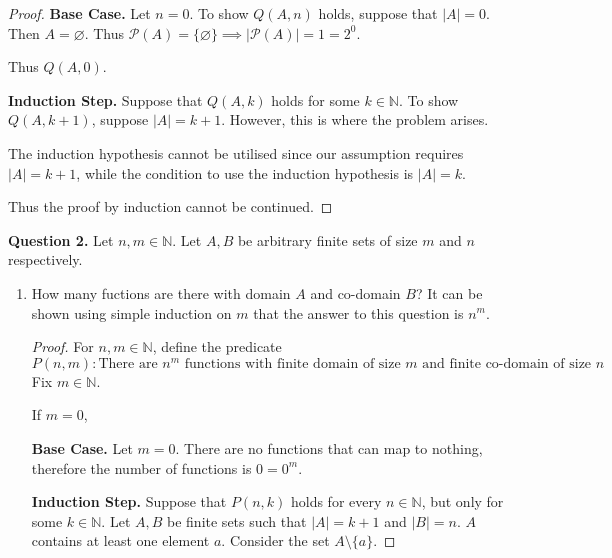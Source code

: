\documentclass[11pt]{article}
\begin{document}
\begin{enumerate}[label=\alph*)]
\begin{proof}
            \textbf{Base Case.} Let \(n=0\). To show \(Q(A, n)\) holds, suppose that \(\left\vert A \right\vert = 0\). Then \(A = \varnothing \). Thus \(\mathcal{P} (A) = \{ \varnothing  \} \implies \left\vert \mathcal{P} (A) \right\vert = 1 = 2^0 \).
            
            Thus \(Q(A, 0)\).

            \textbf{Induction Step.} Suppose that \(Q(A, k)\) holds for some \(k \in \mathbb{N}\). To show \(Q(A, k+1)\), suppose \(\left\vert A \right\vert = k+1\). However, this is where the problem arises. 

            The induction hypothesis cannot be utilised since our assumption requires \(\left\vert A \right\vert = k+1\), while the condition to use the induction hypothesis is \(\left\vert A \right\vert = k\).
            
            Thus the proof by induction cannot be continued.

        \end{proof}
    \end{enumerate}
    \noindent\textbf{Question 2.} Let \(n,m \in \mathbb{N}\). Let \(A, B\) be arbitrary finite sets of size \(m\) and \(n\) respectively.
    \begin{enumerate}[label=\alph*)]
        \item How many fuctions are there with domain \(A\) and co-domain \(B\)?
        It can be shown using simple induction on \(m\) that the answer to this question is \(n^m\).
        \begin{proof}
            For \(n,m \in \mathbb{N} \), define the predicate
            \[
                P(n,m) \colon \text{There are } n^m \text{ functions with finite domain of size } m \text{ and finite co-domain of size } n
            \]
            Fix \(m \in \mathbb{N}\).
            
            If \(m=0\), 

            \textbf{Base Case.} Let \(m = 0\). There are no functions that can map to nothing, therefore the number of functions is \(0 = 0^m\).

            \textbf{Induction Step.} Suppose that \(P(n, k)\) holds for every \(n \in \mathbb{N}\), but only for some \(k \in \mathbb{N}\). Let \(A, B\) be finite sets such that \(\left\vert A \right\vert = k+1\) and \(\left\vert B \right\vert = n\). \(A\) contains at least one element \(a\). Consider the set \(A\setminus\{a\}\).

            

        \end{proof}
    \end{enumerate}
\end{document}
